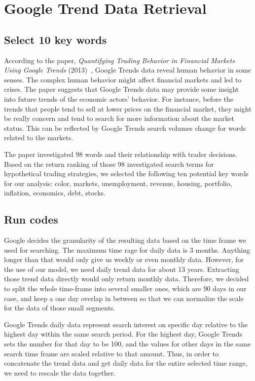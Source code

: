 \documentclass[11pt]{article}
\begin{document}
\section{Google Trend Data Retrieval}
\subsection{Select 10 key words}

According to the paper, \textit{Quantifying Trading Behavior in Financial Markets Using Google Trends} (2013)~\cite{bib1}, Google Trends data reveal human behavior in some senses. The complex human behavior might affect financial markets and led to crises. The paper suggests that Google Trends data may provide some insight into future trends of the economic actors’ behavior. For instance, before the trends that people tend to sell at lower prices on the financial market, they might be really concern and tend to search for more information about the market status. This can be reflected by Google Trends search volumes change for words related to the markets.

\vspace{5mm}

The paper investigated 98 words and their relationship with trader decisions. Based on the return ranking of those 98 investigated search terms for hypothetical trading strategies, we selected the following ten potential key words for our analysis: color, markets, unemployment, revenue, housing, portfolio, inflation, economics, debt, stocks.

\subsection{Run codes}

Google decides the granularity of the resulting data based on the time frame we used for searching. The maximum time rage for daily data is 3 months. Anything longer than that would only give us weekly or even monthly data. However, for the use of our model, we need daily trend data for about 13 years. Extracting those trend data directly would only return monthly data. Therefore, we decided to split the whole time-frame into several smaller ones, which are 90 days in our case, and keep a one day overlap in between so that we can normalize the scale for the data of those small segments. 

\vspace{5mm}

Google Trends daily data represent search interest on specific day relative to the highest day within the same search period. For the highest day, Google Trends sets the number for that day to be 100, and the values for other days in the same search time frame are scaled relative to that amount. Thus, in order to concatenate the trend data and get daily data for the entire selected time range, we need to rescale the data together.
\end{document}
